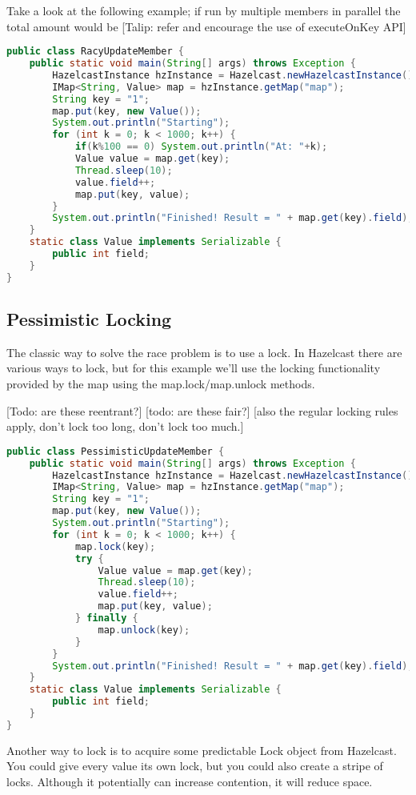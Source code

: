 Take a look at the following example; if run by multiple members in parallel the total amount would be 
[Talip: refer and encourage the use of executeOnKey API]
\begin{lstlisting}[language=java]
public class RacyUpdateMember {
    public static void main(String[] args) throws Exception {
        HazelcastInstance hzInstance = Hazelcast.newHazelcastInstance();
        IMap<String, Value> map = hzInstance.getMap("map");
        String key = "1";
        map.put(key, new Value());
        System.out.println("Starting");
        for (int k = 0; k < 1000; k++) {
            if(k%100 == 0) System.out.println("At: "+k);
            Value value = map.get(key);
            Thread.sleep(10);
            value.field++;
            map.put(key, value);
        }
        System.out.println("Finished! Result = " + map.get(key).field);
    }
    static class Value implements Serializable {
        public int field;
    }
}
\end{lstlisting}

\subsection{Pessimistic Locking}
The classic way to solve the race problem is to use a lock. In Hazelcast there are various ways to lock, but for this example we'll use the locking functionality provided by the map using the map.lock/map.unlock methods.

[Todo: are these reentrant?]
[todo: are these fair?]
[also the regular locking rules apply, don't lock too long, don't lock too much.]

\begin{lstlisting}[language=java]
public class PessimisticUpdateMember {
    public static void main(String[] args) throws Exception {
        HazelcastInstance hzInstance = Hazelcast.newHazelcastInstance();
        IMap<String, Value> map = hzInstance.getMap("map");
        String key = "1";
        map.put(key, new Value());
        System.out.println("Starting");
        for (int k = 0; k < 1000; k++) {
            map.lock(key);
            try {
                Value value = map.get(key);
                Thread.sleep(10);
                value.field++;
                map.put(key, value);
            } finally {
                map.unlock(key);
            }
        }
        System.out.println("Finished! Result = " + map.get(key).field);
    }
    static class Value implements Serializable {
        public int field;
    }
}
\end{lstlisting}
Another way to lock is to acquire some predictable Lock object from Hazelcast. You could give every value its own lock, but you could also create a stripe of locks. Although it potentially can increase contention, it will reduce space.

